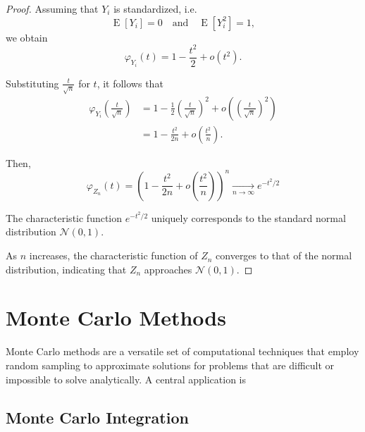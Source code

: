 \documentclass[11pt, headings=standardclasses, parskip=half, twoside]{scrartcl}
\begin{document}
\begin{proof}
Assuming that $Y_{i}$ is standardized, i.e. 
\[
\operatorname{E}\left[Y_{i}\right]=0 \quad \text{and} \quad \operatorname{E}\left[Y_{i}^2\right]=1,
\]
we obtain
\[
\varphi_{Y_{i}}(t) = 1 - \frac{t^2}{2} + o(t^2).
\]

Substituting $\frac{t}{\sqrt{n}}$ for $t$, it follows that
\begin{align*}
    \varphi_{Y_{i}}\left(\frac{t}{\sqrt{n}}\right) &= 1 - \frac{1}{2}\left(\frac{t}{\sqrt{n}}\right)^2 + o\left(\left(\frac{t}{\sqrt{n}}\right)^2\right) \\
    &= 1 - \frac{t^2}{2n} + o\left(\frac{t^2}{n}\right).
\end{align*}



Then,
\[
    \varphi_{Z_{n}}(t) = \left(1 - \frac{t^2}{2n} + o\left(\frac{t^2}{n}\right)\right)^{n} \xrightarrow[n \rightarrow \infty]{} e^{-t^{2} / 2}
\]

The characteristic function $e^{-t^{2} / 2}$ uniquely corresponds to the standard normal distribution $\mathcal{N}(0,1)$.

As $n$ increases, the characteristic function of $Z_{n}$ converges to that of the normal distribution, indicating that $Z_{n}$ approaches $\mathcal{N}(0,1)$.
\end{proof}







\clearpage
\section{Monte Carlo Methods}\label{sec:mc_methods}

Monte Carlo methods are a versatile set of computational techniques that employ random sampling to approximate solutions for problems that are difficult or impossible to solve analytically.
A central application is

\subsection{Monte Carlo Integration}\label{subsec:mc_integration}
\end{document}
